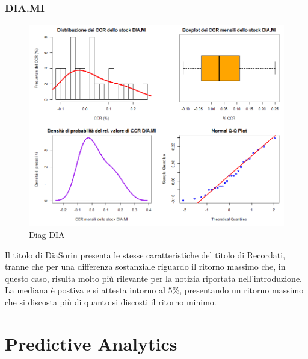 \documentclass[12pt]{article}
\begin{document}
\subsubsection{DIA.MI}
\begin{figure}[!htb]
    \centering
    \includegraphics[width=1\textwidth]{immagini/diag_dia.png}
    \caption{Diag DIA}
\end{figure}
\FloatBarrier
Il titolo di DiaSorin presenta le stesse caratteristiche del titolo di Recordati, tranne che per una differenza sostanziale riguardo il ritorno massimo che, in questo caso, risulta molto più rilevante per la notizia riportata nell'introduzione. La mediana è postiva e si attesta intorno al $5\%$, presentando un ritorno massimo che si discosta più di quanto si discosti il ritorno minimo.
\newpage
\section{Predictive Analytics}
\end{document}
